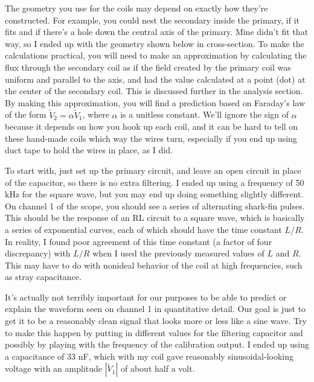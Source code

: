 The geometry you use for the coils may depend on exactly how they're constructed.
For example, you could nest the secondary inside the primary, if it fits
and if there's a hole down the central axis of the primary. Mine didn't
fit that way, so I ended up with the geometry shown below in cross-section. To make the
calculations practical, you will need to make an approximation by
calculating the flux through the secondary coil as if the field created by
the primary coil was uniform and parallel to the axis, and had the value
calculated at a point (dot) at the center of the secondary coil. This is
discussed further in the analysis section. By making this approximation,
you will find a prediction based on Faraday's law of the form $\tilde{V}_2=\alpha \tilde{V}_1$,
where $\alpha$ is a unitless constant. We'll ignore the sign of $\alpha$ because
it depends on how you hook up each coil, and it can be hard to tell on these hand-made
coils which way the wires turn, especially if you end up using duct tape to hold the
wires in place, as I did.


\observations

To start with,  just set up the primary circuit, and leave an open circuit
in place of the capacitor, so there is no extra filtering. I ended up using
a frequency of 50 kHz for the square wave, but you may end up doing something
slightly different. On channel 1 of the scope, you should see a series of
alternating shark-fin pulses. This should be the response of an RL circuit
to a square wave, which is basically a series of exponential curves, each
of which should have the time constant $L/R$. In reality, I found poor
agreement of this time constant (a factor of four discrepancy) with $L/R$ when I used the previously
measured values of $L$ and $R$. This may have to do with nonideal behavior of
the coil at high frequencies, such as stray capacitance.

It's actually not terribly
important for our purposes to be able to predict or explain the waveform seen on channel
1 in quantitative detail. Our goal is just to get it to be a reasonably clean signal
that looks more or less like a sine wave. Try to make this happen by putting in
different values for the filtering capacitor and possibly by playing with the
frequency of the calibration output. I ended up using a capacitance of 33 nF,
which with my coil gave reasonably sinusoidal-looking voltage with an amplitude
$|\tilde{V}_1|$ of about half a volt.


